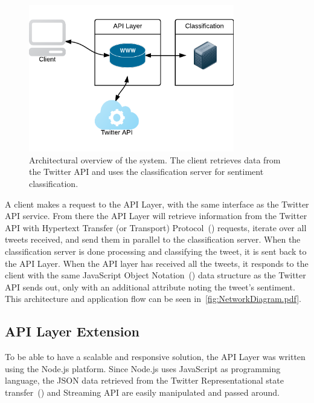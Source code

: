 \begin{figure}[ht]
 \begin{center}
     \includegraphics[width=0.8\textwidth]{../img/NetworkDiagram.pdf}
 \end{center}
 \caption[Architectural overview of the system.]{Architectural overview of the system. The client retrieves data from the Twitter API and uses the classification server for sentiment classification.}
 \label{fig:NetworkDiagram.pdf}
\end{figure}

A client makes a request to the API Layer, with the same interface as the Twitter API service. From there the API Layer will retrieve information from the Twitter API with Hypertext Transfer (or Transport) Protocol~() requests, iterate over all tweets received, and send them in parallel to the classification server. When the classification server is done processing and classifying the tweet, it is sent back to the API Layer. When the API layer has received all the tweets, it responds to the client with the same JavaScript Object Notation~() data structure as the Twitter API sends out, only with an additional attribute noting the tweet's sentiment. This architecture and application flow can be seen in~\autoref{fig:NetworkDiagram.pdf}. 

\subsection{API Layer Extension}

To be able to have a scalable and responsive solution, the API Layer was written using the Node.js platform. Since Node.js uses JavaScript as programming language, the JSON data retrieved from the Twitter Representational state transfer~() and Streaming API are easily manipulated and passed around. 

